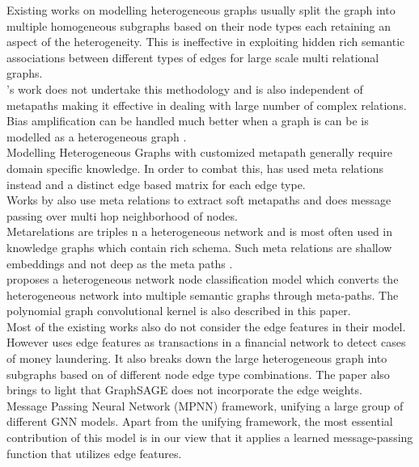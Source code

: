\documentclass{report} %
\begin{document}
Existing works \cite{PR-HGNN-2024} on modelling heterogeneous graphs usually split the graph into multiple homogeneous subgraphs based on their node types each retaining an aspect of the heterogeneity.
This is ineffective in exploiting hidden rich semantic associations between different types of edges for large scale multi relational graphs. \\
\cite{RSHGNN-2019}'s work does not undertake this methodology and is also independent of metapaths making it effective in dealing with large number of complex relations.\\
Bias amplification can be handled much better when a graph is can be is modelled as a heterogeneous graph \cite{EV HGNN-2023}. \\
Modelling Heterogeneous Graphs with customized metapath generally require domain specific knowledge. 
In order to combat this, \cite{HGT-2022} has used meta relations instead and a distinct edge based matrix for each edge type.\\
Works by \cite{MHGNN-2023} also use meta relations to extract soft metapaths and does message passing over multi hop neighborhood of nodes. \\
Metarelations are triples n a heterogeneous network and is most often used in knowledge graphs which contain rich schema. Such meta relations are shallow embeddings and not deep as the meta paths \cite{HGNN-2020}. \\

\cite{HNNC-2023} proposes a heterogeneous network node classification model which converts the heterogeneous network into multiple semantic graphs through meta-paths. 
The polynomial graph convolutional kernel is also described in this paper.\\ 

Most of the existing works also do not consider the edge features in their model. However \cite{ML HGNN-2023} uses edge features as transactions in a financial network to detect cases of money laundering.
It also breaks down the large heterogeneous graph into subgraphs based on  of different node edge type combinations. The paper also brings to light that GraphSAGE does not incorporate the edge weights.\\

Message Passing Neural Network (MPNN) framework, unifying a
large group of different GNN models. Apart from the unifying framework, the most essential contribution
of this model is in our view that it applies a learned message-passing function that utilizes edge features.\\
\end{document}

